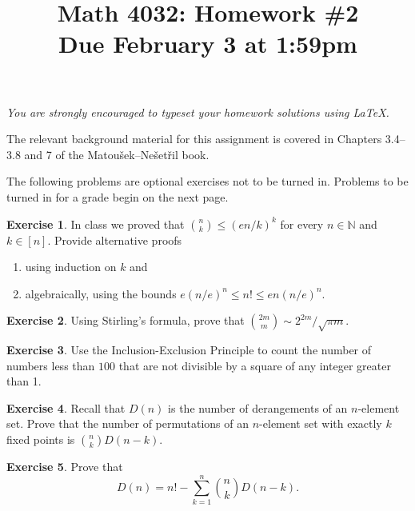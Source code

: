 \documentclass[11pt, letter]{amsart}
\title[Math 4032: Homework \#2\qquad Due February 3 at 1:59pm]{Math 4032: Homework \#2\\
  Due February 3 at 1:59pm}
\theoremstyle{definition}
\newtheorem{exercise}{Exercise}[]
\begin{document}
\maketitle


\begin{center}
  \textit{You are strongly encouraged to typeset your homework solutions using \LaTeX.}
\end{center}

\vspace{1cm}
The relevant background material for this assignment is covered in Chapters 3.4--3.8 and 7 of the Matou\v{s}ek--Ne\v{s}et\v{r}il book.

\vspace{1cm}
The following problems are optional exercises not to be turned in.  Problems to be turned in for a grade begin on the next page.  

\begin{exercise}
  In class we proved that $\binom{n}{k} \leq (en / k)^k$ for every $n \in \mathbb N$ and $k \in [n]$.  Provide alternative proofs
  \begin{enumerate}
  \item using induction on $k$ and
  \item algebraically, using the bounds $e(n / e)^n \leq n! \leq en (n / e)^n$.
  \end{enumerate}
\end{exercise}

\begin{exercise}
  Using Stirling's formula, prove that $\binom{2m}{m} \sim 2^{2m} / \sqrt{\pi m}$.
\end{exercise}

\begin{exercise}
  Use the Inclusion-Exclusion Principle to count the number of numbers less than $100$ that are not divisible by a square of any integer greater than 1.
\end{exercise}

\begin{exercise}
  Recall that $D(n)$ is the number of derangements of an $n$-element set.  Prove that the number of permutations of an $n$-element set with exactly $k$ fixed points is $\binom{n}{k} D(n - k)$.
\end{exercise}

\begin{exercise}
  Prove that
  \begin{equation*}
    D(n) = n! - \sum_{k=1}^n \binom{n}{k}D(n - k).
  \end{equation*}
\end{exercise}
\end{document}
